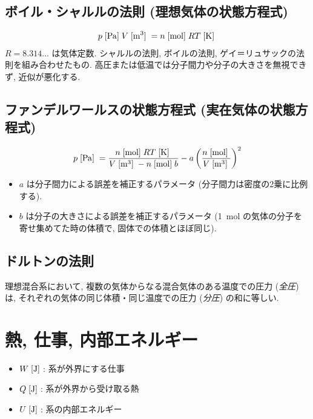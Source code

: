 \documentclass[a4paper,11pt]{jsarticle}
\newcommand{\braunit}[1]{\;\text{[}\unit[per-mode = symbol]{#1}\text{]}\;}
\begin{document}
\subsection{ボイル・シャルルの法則 (理想気体の状態方程式)}
\begin{align*}
  p\braunit{\Pa}V\braunit{\m^3} = n\braunit{\mol}RT\braunit{\K}
\end{align*}
$R=8.314\dots$ は気体定数. シャルルの法則, ボイルの法則, ゲイ＝リュサックの法則を組み合わせたもの. 高圧または低温では分子間力や分子の大きさを無視できず, 近似が悪化する.
\cite[pp.15]{thermo}

\subsection{ファンデルワールスの状態方程式 (実在気体の状態方程式)}
\begin{align*}
  p\braunit{\Pa} = \frac{n\braunit{\mol}RT\braunit{\K}}{V\braunit{\m^3} - n\braunit{\mol}b} - a\left(\frac{n\braunit{\mol}}{V\braunit{\m^3}}\right)^2
\end{align*}
\begin{itemize}
  \item $a$ は分子間力による誤差を補正するパラメータ (分子間力は密度の2乗に比例する).
  \item $b$ は分子の大きさによる誤差を補正するパラメータ (\qty{1}{\mol} の気体の分子を寄せ集めてた時の体積で, 固体での体積とほぼ同じ).
\end{itemize}
\cite[pp.17]{thermo}

\subsection{ドルトンの法則}
理想混合系において, 複数の気体からなる混合気体のある温度での圧力 (\emph{全圧}) は,
それぞれの気体の同じ体積・同じ温度での圧力 (\emph{分圧}) の和に等しい.
\cite[pp.18]{thermo}

\section{熱, 仕事, 内部エネルギー}
\begin{itemize}
  \item $W\braunit{\J}$: 系が外界にする仕事
  \item $Q\braunit{\J}$: 系が外界から受け取る熱
  \item $U\braunit{\J}$: 系の内部エネルギー
\end{itemize}
\end{document}
